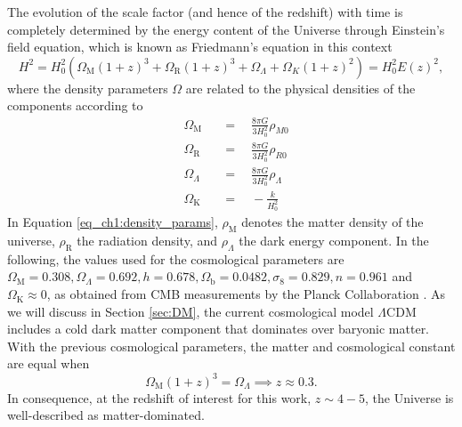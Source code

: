 The evolution of the scale factor (and hence of the redshift) with time is completely determined by the energy content of the Universe through Einstein's field equation, which is known as Friedmann's equation in this context
\begin{equation}
    H^2=H_0^2\left( \Omega_\text{M} (1+z)^3+\Omega_\text{R} (1+z)^3 +\Omega_\Lambda + \Omega_K (1+z)^2 \right)=H_0^2E(z)^2,
\end{equation}
where the density parameters $\Omega$ are related to the physical densities of the components according to
\begin{equation}\label{eq_ch1:density_params}
    \begin{aligned}&\Omega_\text{M}&&=\quad\frac{8\pi G}{3H_0^2}\rho_{M0}\\&\Omega_\text{R}&&=\quad\frac{8\pi G}{3H_0^2}\rho_{R0}\\&\Omega_{\Lambda}&&=\quad\frac{8\pi G}{3H_0^2}\rho_{\Lambda}\\&\Omega_\text{K}&&=\quad-\frac k{H_0^2}\end{aligned}
\end{equation}
In Equation \ref{eq_ch1:density_params}, $\rho_\text{M}$ denotes the matter density of the universe, $\rho_\text{R}$ the radiation density, and $\rho_\Lambda$ the dark energy component. In the following, the values used for the cosmological parameters are $\Omega_\text{M}=0.308,\Omega_\Lambda=0.692,h=0.678,\Omega_\text{b}=0.0482,\sigma_8=0.829,n=0.961$ and $\Omega_\text{K}\approx 0$, as obtained from CMB measurements by the Planck Collaboration \cite{planck2014}. As we will discuss in Section \ref{sec:DM}, the current cosmological model $\Lambda$CDM includes a cold dark matter component that dominates over baryonic matter. With the previous cosmological parameters, the matter and cosmological constant are equal when
\begin{equation}
    \Omega_\text{M}(1+z)^3=\Omega_\Lambda \implies z\approx 0.3.
\end{equation}
In consequence, at the redshift of interest for this work, $z\sim 4-5$, the Universe is well-described as matter-dominated.









